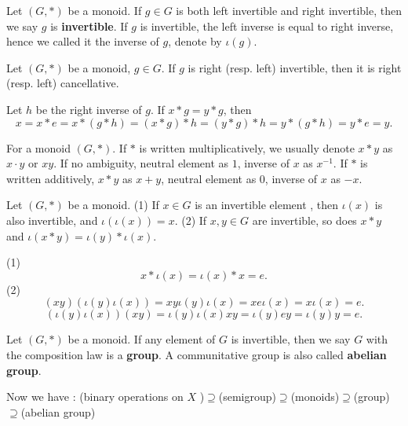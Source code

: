 \begin{definitionenv}
    Let $(G, *)$ be a monoid. If $g\in G$ is both left invertible and right invertible,  then we say $g$ is \textbf{invertible}.
    If $g$ is invertible,  the left inverse is equal to right inverse,  hence we called it the inverse of $g$,  denote by $\iota(g)$.
\end{definitionenv}
\begin{propositionenv}
    Let $(G, *)$ be a monoid,  $g\in G$. If $g$ is right (resp. left) invertible,  then it is right (resp. left) cancellative.
\end{propositionenv}
\begin{proofenv}
    Let $h$ be the right inverse of $g$. If $x*g=y*g$,  then 
    $$x=x*e=x*(g*h)=(x*g)*h=(y*g)*h=y*(g*h)=y*e=y.$$
\end{proofenv}
\begin{notationenv}
    For a monoid $(G, *)$.
    \newline
    If $*$ is written multiplicatively,  we usually denote $x*y$ as $x\cdot y$ or $xy$. If no ambiguity,  neutral element as $1$, inverse of $x$ as $x^{-1}$.
    \newline
    If $*$ is written additively,  $x*y$ as $x+y$,  neutral element as $0$,  inverse of $x$ as $-x$.
\end{notationenv}
\begin{propositionenv}\label{proposition5.2.4}
    Let $(G, *)$ be a monoid.
    \newline
    (1) If $x\in G$ is an invertible element ,  then $\iota (x)$ is also invertible,  and $\iota(\iota(x))=x$.
    \newline
    (2) If $x, y\in G$ are invertible,  so does $x*y$ and $\iota(x*y)=\iota(y)*\iota(x)$.
\end{propositionenv}
\begin{proofenv}
    \quad\newline
    (1) $$x*\iota(x)=\iota(x)*x=e.$$
    (2) $$(xy)(\iota(y)\iota(x))=xy\iota(y)\iota(x)=xe\iota(x)=x\iota(x)=e.$$
    $$(\iota(y)\iota(x))(xy)=\iota(y)\iota(x)xy=\iota(y)ey=\iota(y)y=e.$$
\end{proofenv}
\begin{definitionenv}
    Let $(G, *)$ be a monoid. If any element of $G$ is invertible,  then we say $G$ with the composition law is a \textbf{group}. A communitative group is also called \textbf{abelian group}.
\end{definitionenv}
\begin{box2}
   Now we have : 
   \newline
   {\color{mlv} (binary operations on $X$ )$\supseteq$(semigroup)$\supseteq$(monoids)$\supseteq$(group)$\supseteq$(abelian group)}

\end{box2}
